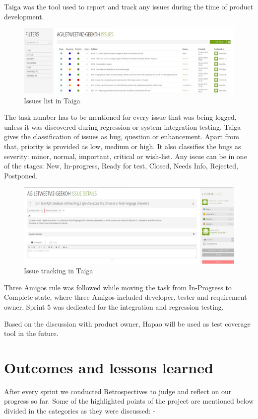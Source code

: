 \documentclass[11pt]{article}
\begin{document}
Taiga\cite{TaigaSite} was the tool used to report and track any issues during the time of product development.

\begin{figure}[h]
\centering
\includegraphics[width=\textwidth]{Issues.jpg}
\caption{Issues list in Taiga\cite{TaigaSite}}
\end{figure}

The task number has to be mentioned for every issue that was being logged, unless it was discovered during regression or system integration testing. Taiga gives the classification of issues as bug, question or enhancement. Apart from that, priority is provided as low, medium or high. It also classifies the bugs as severity:  minor, normal, important, critical or wish-list. Any issue can be in one of the stages: New, In-progress, Ready for test, Closed, Needs Info, Rejected, Postponed. 

\begin{figure}[h]
\centering
\includegraphics[width=\textwidth]{Issue2.jpg}
\caption{Issue tracking in Taiga\cite{TaigaSite}}
\end{figure}

Three Amigos rule was followed while moving the task from In-Progress to Complete state, where three Amigos included developer, tester and requirement owner. Sprint 5 was dedicated for the integration and regression testing. 

Based on the discussion with product owner, Hapao will be used as test coverage tool in the future.

\section{Outcomes and lessons learned}
After every sprint we conducted Retrospectives to judge and reflect on our progress so far. Some of the highlighted points of the project are mentioned below divided in the categories as they were discussed: - 
\end{document}
